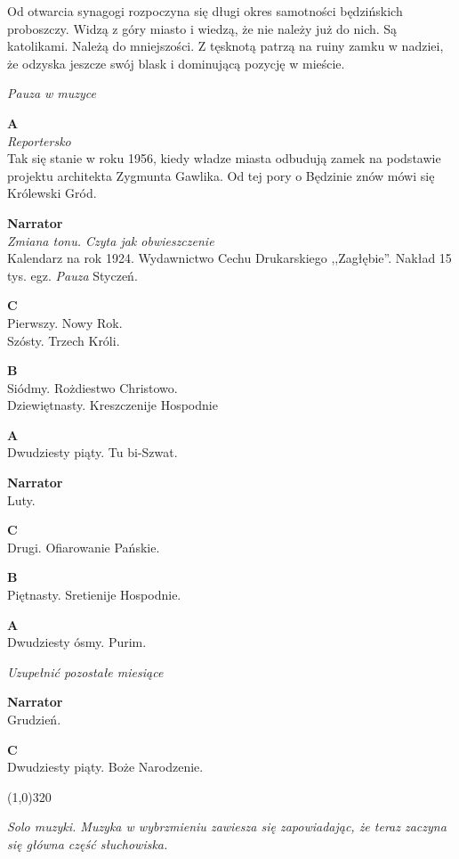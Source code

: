 \documentclass[11pt,a4paper,oneside]{article}
\begin{document}
Od otwarcia synagogi rozpoczyna się długi okres samotności będzińskich
proboszczy. Widzą z góry miasto i wiedzą, że nie należy już do nich.
Są katolikami. Należą do mniejszości. Z tęsknotą patrzą na ruiny zamku w nadziei,
że odzyska jeszcze swój blask i dominującą pozycję w mieście. 

{\color{light-gray} \emph{Pauza w muzyce}}

\textbf{A}\\
{\color{light-gray} \emph{Reportersko}}\\
Tak się stanie w roku 1956, kiedy władze miasta odbudują zamek na podstawie
projektu architekta Zygmunta Gawlika. Od tej pory o Będzinie znów mówi się
Królewski Gród.

\textbf{Narrator}\\
{\color{light-gray} \emph{Zmiana tonu. Czyta jak obwieszczenie}}\\
Kalendarz na rok 1924. Wydawnictwo Cechu Drukarskiego
,,Zagłębie''. Nakład 15 tys. egz. {\color{light-gray} \emph{Pauza}} Styczeń.

\textbf{C}\\
Pierwszy. Nowy Rok. \\
Szósty. Trzech Króli.

\textbf{B}\\
Siódmy. Rożdiestwo Christowo. \\
Dziewiętnasty. Kreszczenije Hospodnie

\textbf{A}\\
Dwudziesty piąty. Tu bi-Szwat. %

\textbf{Narrator}\\
Luty.

\textbf{C}\\
Drugi. Ofiarowanie Pańskie.

\textbf{B}\\
Piętnasty. Sretienije Hospodnie.

\textbf{A}\\
Dwudziesty ósmy. Purim.

{\color{red} \emph{Uzupełnić pozostałe miesiące}}

\textbf{Narrator}\\
Grudzień.

\textbf{C}\\
Dwudziesty piąty. Boże Narodzenie.

\line(1,0){320}

{\color{light-gray} \emph{Solo muzyki. Muzyka w wybrzmieniu zawiesza się
zapowiadając, że teraz zaczyna się główna część słuchowiska.}}
\end{document}
